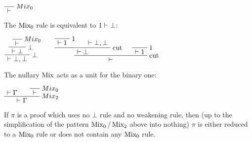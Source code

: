 \(\LabelRule{Mix_0}
\NulRule{\vdash}
\DisplayProof\)

The \(\operatorname{Mix_0}\) rule is equivalent to \(1\vdash\bot\):

\(\LabelRule{Mix_0}
\NulRule{\vdash}
\LabelRule{\bot}
\UnaRule{\vdash\bot}
\LabelRule{\bot}
\UnaRule{\vdash\bot,\bot}
\DisplayProof
\qquad
\LabelRule{\one}
\NulRule{\vdash\one}
\AxRule{\vdash\bot,\bot}
\LabelRule{\rulename{cut}}
\BinRule{\vdash\bot}
\LabelRule{\one}
\NulRule{\vdash\one}
\LabelRule{\rulename{cut}}
\BinRule{\vdash}
\DisplayProof\)

The nullary \(\operatorname{Mix}\) acts as a unit for the binary one:

\(\AxRule{\vdash\Gamma}
\LabelRule{Mix_0}
\NulRule{\vdash}
\LabelRule{Mix_2}
\BinRule{\vdash\Gamma}
\DisplayProof\)

If \(\pi\) is a proof which uses no \(\bot\) rule and no weakening rule,
then (up to the simplification of the pattern
\(\operatorname{Mix_0}/\operatorname{Mix_2}\) above into nothing) \(\pi\) is
either reduced to a \(\operatorname{Mix_0}\) rule or does not contain any
\(\operatorname{Mix_0}\) rule.


